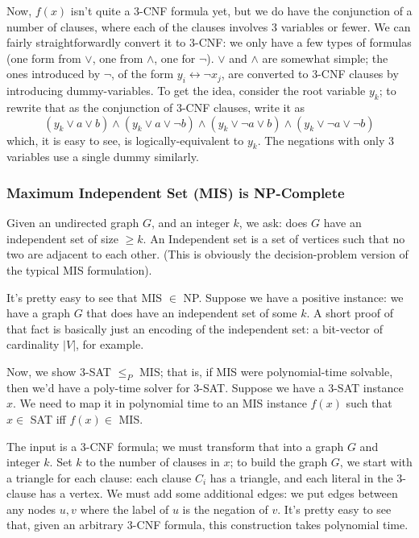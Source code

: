 \documentclass{article}
\begin{document}
Now, $f(x)$ isn't quite a 3-CNF formula yet, but we do have the conjunction of
a number of clauses, where each of the clauses involves 3 variables or
fewer. We can fairly straightforwardly convert it to 3-CNF: we only have
a few types of formulas (one form from $\vee$, one from $\wedge$, one
for $\neg$).
$\vee$ and $\wedge$ are somewhat simple; the ones introduced by $\neg$,
of the form $y_i \leftrightarrow \neg x_j$, are converted to 3-CNF clauses
by introducing dummy-variables.
To get the idea, consider the root variable $y_k$; to rewrite that as the
conjunction of 3-CNF clauses, write it as
$$
(y_k \vee a \vee b) \wedge 
(y_k \vee a \vee \neg b) \wedge
(y_k \vee \neg a \vee b) \wedge 
(y_k \vee \neg a \vee \neg b)
$$
which, it is easy to see, is logically-equivalent to $y_k$.
The negations with only 3 variables use a single dummy similarly.



\subsubsection{Maximum Independent Set (MIS) is NP-Complete}

Given an undirected graph $G$, and an integer $k$, we ask: does $G$ have
an independent set of size $\geq k$.
An Independent set is a set of vertices such that no two are adjacent to
each other.
(This is obviously the decision-problem version of the typical MIS 
formulation).

It's pretty easy to see that MIS $\in$ NP. Suppose we have a positive instance:
we have a graph $G$ that does have an independent set of some $k$. A short 
proof
of that fact is basically just an encoding of the independent set: a bit-vector
of cardinality $|V|$, for example.

Now, we show 3-SAT $\leq_P$ MIS; that is, if MIS were polynomial-time solvable,
then we'd have a poly-time solver for 3-SAT.
Suppose we have a 3-SAT instance $x$.
We need to map it in polynomial time to an MIS instance $f(x)$ such that
$x\in $ SAT iff $f(x)\in$ MIS.

The input is a 3-CNF formula; we must transform that into a graph $G$ and
integer $k$.
Set $k$ to the number of clauses in $x$; to build the graph $G$, we start
with a triangle for each clause: each clause $C_i$ has a triangle,
and each literal in the 3-clause has a vertex.
We must add some additional edges: we put edges between any nodes $u,v$ where
the label of $u$ is the negation of $v$.
It's pretty easy to see that, given an arbitrary 3-CNF formula, this 
construction
takes polynomial time.
\end{document}
